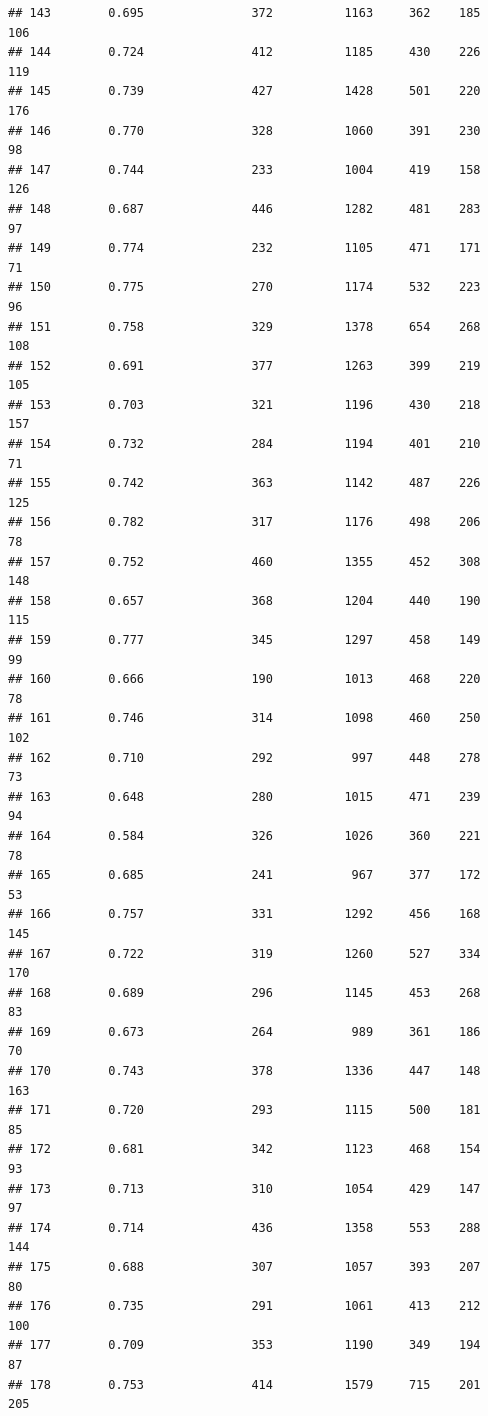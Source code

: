 \documentclass[]{book}
\begin{document}
\begin{verbatim}
## 143        0.695               372          1163     362    185    106
## 144        0.724               412          1185     430    226    119
## 145        0.739               427          1428     501    220    176
## 146        0.770               328          1060     391    230     98
## 147        0.744               233          1004     419    158    126
## 148        0.687               446          1282     481    283     97
## 149        0.774               232          1105     471    171     71
## 150        0.775               270          1174     532    223     96
## 151        0.758               329          1378     654    268    108
## 152        0.691               377          1263     399    219    105
## 153        0.703               321          1196     430    218    157
## 154        0.732               284          1194     401    210     71
## 155        0.742               363          1142     487    226    125
## 156        0.782               317          1176     498    206     78
## 157        0.752               460          1355     452    308    148
## 158        0.657               368          1204     440    190    115
## 159        0.777               345          1297     458    149     99
## 160        0.666               190          1013     468    220     78
## 161        0.746               314          1098     460    250    102
## 162        0.710               292           997     448    278     73
## 163        0.648               280          1015     471    239     94
## 164        0.584               326          1026     360    221     78
## 165        0.685               241           967     377    172     53
## 166        0.757               331          1292     456    168    145
## 167        0.722               319          1260     527    334    170
## 168        0.689               296          1145     453    268     83
## 169        0.673               264           989     361    186     70
## 170        0.743               378          1336     447    148    163
## 171        0.720               293          1115     500    181     85
## 172        0.681               342          1123     468    154     93
## 173        0.713               310          1054     429    147     97
## 174        0.714               436          1358     553    288    144
## 175        0.688               307          1057     393    207     80
## 176        0.735               291          1061     413    212    100
## 177        0.709               353          1190     349    194     87
## 178        0.753               414          1579     715    201    205

\end{verbatim}
\end{document}
